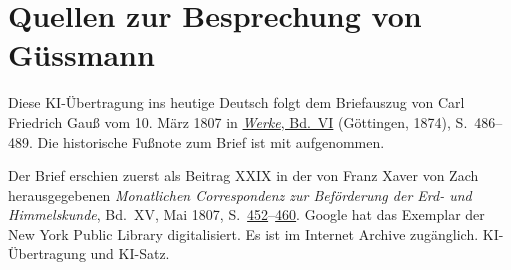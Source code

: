 \clearpage
{}
\section*{Quellen zur Besprechung von Güssmann}
\noindent Diese KI-Übertragung ins heutige Deutsch folgt dem Briefauszug von Carl Friedrich Gauß vom 10. März 1807 in \href{https://gdz.sub.uni-goettingen.de/id/PPN236007467}{\textit{Werke}, Bd.~VI} (Göttingen, 1874), S.~486--489. Die historische Fußnote zum Brief ist mit aufgenommen.
\par\smallskip\noindent Der Brief erschien zuerst als Beitrag XXIX in der von Franz Xaver von Zach herausgegebenen \textit{Monatlichen Correspondenz zur Beförderung der Erd- und Himmelskunde}, Bd.~XV, Mai 1807, S.~\href{https://archive.org/download/monatlichecorre21zachgoog/page/n469.jpg}{452}--\href{https://archive.org/download/monatlichecorre21zachgoog/page/n477.jpg}{460}. Google hat das Exemplar der New York Public Library digitalisiert. Es ist im Internet Archive zugänglich. KI-Übertragung und KI-Satz.
\clearpage
